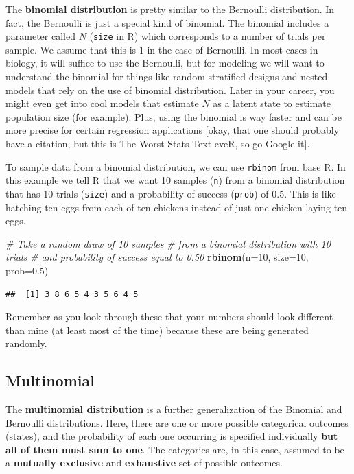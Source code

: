 \documentclass[
]{book}
\newenvironment{Shaded}{\begin{snugshade}}{\end{snugshade}}
\newcommand{\CommentTok}[1]{\textcolor[rgb]{0.56,0.35,0.01}{\textit{#1}}}
\newcommand{\DataTypeTok}[1]{\textcolor[rgb]{0.13,0.29,0.53}{#1}}
\newcommand{\DecValTok}[1]{\textcolor[rgb]{0.00,0.00,0.81}{#1}}
\newcommand{\FloatTok}[1]{\textcolor[rgb]{0.00,0.00,0.81}{#1}}
\newcommand{\KeywordTok}[1]{\textcolor[rgb]{0.13,0.29,0.53}{\textbf{#1}}}
\newcommand{\NormalTok}[1]{#1}
\begin{document}
The \textbf{binomial distribution} is pretty similar to the Bernoulli distribution. In fact, the Bernoulli is just a special kind of binomial. The binomial includes a parameter called \(N\) (\texttt{size} in R) which corresponds to a number of trials per sample. We assume that this is 1 in the case of Bernoulli. In most cases in biology, it will suffice to use the Bernoulli, but for modeling we will want to understand the binomial for things like random stratified designs and nested models that rely on the use of binomial distribution. Later in your career, you might even get into cool models that estimate \(N\) as a latent state to estimate population size (for example). Plus, using the binomial is way faster and can be more precise for certain regression applications {[}okay, that one should probably have a citation, but this is The Worst Stats Text eveR, so go Google it{]}.

To sample data from a binomial distribution, we can use \texttt{rbinom} from base R. In this example we tell R that we want 10 samples (\texttt{n}) from a binomial distribution that has 10 trials (\texttt{size}) and a probability of success (\texttt{prob}) of 0.5. This is like hatching ten eggs from each of ten chickens instead of just one chicken laying ten eggs.

\begin{Shaded}
\begin{Highlighting}[]
\CommentTok{# Take a random draw of 10 samples}
\CommentTok{# from a binomial distribution with 10 trials}
\CommentTok{# and probability of success equal to 0.50}
\KeywordTok{rbinom}\NormalTok{(}\DataTypeTok{n=}\DecValTok{10}\NormalTok{, }\DataTypeTok{size=}\DecValTok{10}\NormalTok{, }\DataTypeTok{prob=}\FloatTok{0.5}\NormalTok{)}
\end{Highlighting}
\end{Shaded}

\begin{verbatim}
##  [1] 3 8 6 5 4 3 5 6 4 5
\end{verbatim}

Remember as you look through these that your numbers should look different than mine (at least most of the time) because these are being generated randomly.

\hypertarget{multinomial}{%
\subsection{Multinomial}\label{multinomial}}

The \textbf{multinomial distribution} is a further generalization of the Binomial and Bernoulli distributions. Here, there are one or more possible categorical outcomes (states), and the probability of each one occurring is specified individually \textbf{but all of them must sum to one}. The categories are, in this case, assumed to be a \textbf{mutually exclusive} and \textbf{exhaustive} set of possible outcomes.
\end{document}
